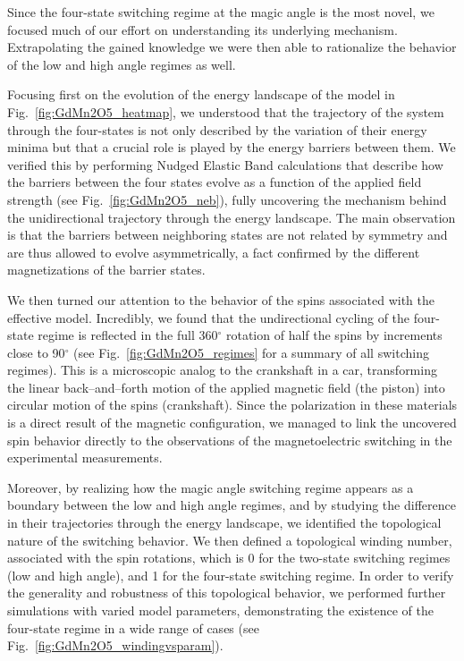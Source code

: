 Since the four-state switching regime at the magic angle is the most novel, we focused much of our effort on understanding its underlying mechanism. Extrapolating the gained knowledge we were then able to rationalize the behavior of the low and high angle regimes as well.

Focusing first on the evolution of the energy landscape of the model in Fig.~\ref{fig:GdMn2O5_heatmap}, we understood that the trajectory of the system through the four-states is not only described by the variation of their energy minima but that a crucial role is played by the energy barriers between them.
We verified this by performing Nudged Elastic Band calculations that describe how the barriers between the four states evolve as a function of the applied field strength (see Fig.~\ref{fig:GdMn2O5_neb}), fully uncovering the mechanism behind the unidirectional trajectory through the energy landscape.
The main observation is that the barriers between neighboring states are not related by symmetry and are thus allowed to evolve asymmetrically, a fact confirmed by the different magnetizations of the barrier states.

We then turned our attention to the behavior of the spins associated with the effective model. Incredibly, we found that the undirectional cycling of the four-state regime is reflected in the full 360$^\circ$ rotation of half the spins by increments close to 90$^\circ$ (see Fig.~\ref{fig:GdMn2O5_regimes} for a summary of all switching regimes).
This is a microscopic analog to the crankshaft in a car, transforming the linear back--and--forth motion of the applied magnetic field (the piston) into circular motion of the spins (crankshaft).
Since the polarization in these materials is a direct result of the magnetic configuration, we managed to link the uncovered spin behavior directly to the observations of the magnetoelectric switching in the experimental measurements.

Moreover, by realizing how the magic angle switching regime appears as a boundary between the low and high angle regimes, and by studying the difference in their trajectories through the energy landscape, we identified the topological nature of the switching behavior.
We then defined a topological winding number, associated with the spin rotations, which is 0 for the two-state switching regimes (low and high angle), and 1 for the four-state switching regime.
In order to verify the generality and robustness of this topological behavior, we performed further simulations with varied model parameters, demonstrating the existence of the four-state regime in a wide range of cases (see Fig.~\ref{fig:GdMn2O5_windingvsparam}).

